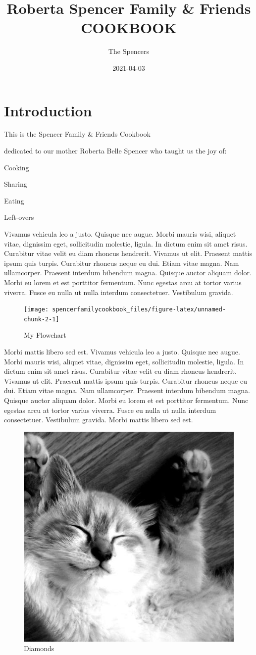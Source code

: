 \documentclass[
]{book}
\title{Roberta Spencer Family \& Friends COOKBOOK}
\author{The Spencers}
\date{2021-04-03}
\begin{document}
\maketitle

{
\setcounter{tocdepth}{1}
\tableofcontents
}
\hypertarget{introduction}{%
\chapter{Introduction}\label{introduction}}

This is the Spencer Family \& Friends Cookbook

dedicated to our mother Roberta Belle Spencer who taught us the joy of:

Cooking

Sharing

Eating

Left-overs

Vivamus vehicula leo a justo. Quisque nec augue. Morbi mauris wisi, aliquet vitae, dignissim eget, sollicitudin molestie, ligula. In dictum enim sit amet risus. Curabitur vitae velit eu diam rhoncus hendrerit. Vivamus ut elit. Praesent mattis ipsum quis turpis. Curabitur rhoncus neque eu dui. Etiam vitae magna. Nam ullamcorper. Praesent interdum bibendum magna. Quisque auctor aliquam dolor. Morbi eu lorem et est porttitor fermentum. Nunc egestas arcu at tortor varius viverra. Fusce eu nulla ut nulla interdum consectetuer. Vestibulum gravida.

\begin{figure}

\hfill{}\texttt{[image: spencerfamilycookbook\_files/figure-latex/unnamed-chunk-2-1]} 

\caption{My Flowchart}\label{fig:unnamed-chunk-2}
\end{figure}

Morbi mattis libero sed est. Vivamus vehicula leo a justo. Quisque nec augue. Morbi mauris wisi, aliquet vitae, dignissim eget, sollicitudin molestie, ligula. In dictum enim sit amet risus. Curabitur vitae velit eu diam rhoncus hendrerit. Vivamus ut elit. Praesent mattis ipsum quis turpis. Curabitur rhoncus neque eu dui. Etiam vitae magna. Nam ullamcorper. Praesent interdum bibendum magna. Quisque auctor aliquam dolor. Morbi eu lorem et est porttitor fermentum. Nunc egestas arcu at tortor varius viverra. Fusce eu nulla ut nulla interdum consectetuer. Vestibulum gravida. Morbi mattis libero sed est.

\begin{figure}  
 \begin{center}
    \includegraphics[width=.2\textwidth]{"images/500.jpg"}
  \caption{Diamonds} 
\end{center}
\end{figure}
\end{document}
